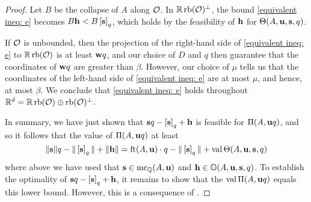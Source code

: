 \documentclass[11pt]{amsart}
\begin{document}
\begin{proof}
Let $B$ be the collapse of $A$ along $\mathcal{O}$.  In $\mathbb{R} \operatorname{rb}(\mathcal{O})^{\perp}$, the bound \eqref{equivalent ineq: e} becomes $B \mathbf{h} < B \left[ \mathbf{s} \right]_q$, which holds by the feasibility of $\mathbf{h}$ for $\Theta(A, \mathbf{u}, \mathbf{s}, q)$.  

If $\mathcal{O}$ is unbounded, then the projection of the right-hand side of \eqref{equivalent ineq: e} to $\mathbb{R} \operatorname{rb}(\mathcal{O})$ is at least $\mathbf{w}q$, and our choice of $D$ and $q$ then guarantee that the coordinates of $\mathbf{w}q$ are greater than $\beta$.  However,  our choice of $\mu$ tells us that the coordinates of the left-hand side of \eqref{equivalent ineq: e} are at most $\mu$, and hence, at most $\beta$.  We conclude that \eqref{equivalent ineq: e} holds throughout $\mathbb{R}^d = \mathbb{R} \operatorname{rb}(\mathcal{O}) \oplus \operatorname{rb}(\mathcal{O})^{\perp}$.

In summary, we have just shown that $\mathbf{s}q-\left[ \mathbf{s} \right]_q + \mathbf{h}$ is feasible for $\Pi(A, \mathbf{u}q)$, and so it follows that the value of $\Pi(A, \mathbf{u}q)$ at least 
\[  \| \mathbf{s} \|q - \| \left[ \mathbf{s} \right]_q \| + \| \mathbf{h} \| = \operatorname{ft}(A, \mathbf{u}) \cdot q - \| \left[ \mathbf{s} \right]_q \| + \operatorname{val} \Theta(A, \mathbf{u}, \mathbf{s}, q) \] 
where above we have used that $\mathbf{s} \in \operatorname{mc}_{\mathbb{Q}}(A, \mathbf{u})$ and $\mathbf{h} \in \mathbb{O}(A, \mathbf{u}, \mathbf{s}, q)$.  To establish the optimality of $\mathbf{s}q - \left[ \mathbf{s} \right]_q + \mathbf{h}$, it remains to show that the $\operatorname{val} \Pi(A, \mathbf{u}q)$ equals this lower bound.  However, this is a consequence of .
\end{proof}
\end{document}
